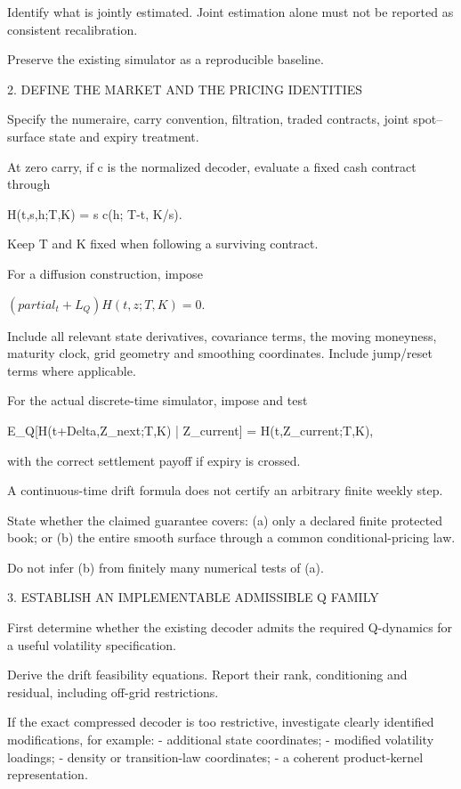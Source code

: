 \documentclass[11pt,a4paper]{article}
\numberwithin{equation}{section}
\theoremstyle{definition}\newtheorem{definition}[theorem]{Definition}
\theoremstyle{remark}\newtheorem{remark}[theorem]{Remark}
\begin{document}
Identify what is jointly estimated. Joint estimation alone must not be
reported as consistent recalibration.

Preserve the existing simulator as a reproducible baseline.

2. DEFINE THE MARKET AND THE PRICING IDENTITIES

Specify the numeraire, carry convention, filtration, traded contracts,
joint spot–surface state and expiry treatment.

At zero carry, if c is the normalized decoder, evaluate a fixed cash
contract through

  H(t,s,h;T,K) = s c(h; T-t, K/s).

Keep T and K fixed when following a surviving contract.

For a diffusion construction, impose

  $(partial_t + L_Q) H(t,z;T,K) = 0.$

Include all relevant state derivatives, covariance terms, the moving
moneyness, maturity clock, grid geometry and smoothing coordinates.
Include jump/reset terms where applicable.

For the actual discrete-time simulator, impose and test

  E_Q[H(t+Delta,Z_next;T,K) | Z_current]
      = H(t,Z_current;T,K),

with the correct settlement payoff if expiry is crossed.

A continuous-time drift formula does not certify an arbitrary finite
weekly step.

State whether the claimed guarantee covers:
(a) only a declared finite protected book; or
(b) the entire smooth surface through a common conditional-pricing law.

Do not infer (b) from finitely many numerical tests of (a).

3. ESTABLISH AN IMPLEMENTABLE ADMISSIBLE Q FAMILY

First determine whether the existing decoder admits the required
Q-dynamics for a useful volatility specification.

Derive the drift feasibility equations. Report their rank, conditioning
and residual, including off-grid restrictions.

If the exact compressed decoder is too restrictive, investigate clearly
identified modifications, for example:
- additional state coordinates;
- modified volatility loadings;
- density or transition-law coordinates;
- a coherent product-kernel representation.
\end{document}
